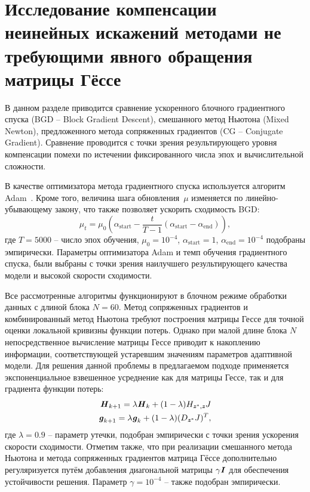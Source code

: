 \section{Исследование компенсации неинейных искажений методами не требующими явного обращения матрицы Гёссе} \label{sec:conj_grad}

В данном разделе приводится сравнение ускоренного блочного градиентного спуска (BGD -- Block Gradient Descent), смешанного метод Ньютона (Mixed Newton), предложенного метода сопряженных градиентов (CG -- Conjugate Gradient). Сравнение проводится с точки зрения результирующего уровня компенсации помехи по истечении фиксированного числа эпох и вычислительной сложности.

В качестве оптимизатора метода градиентного спуска используется алгоритм Adam~\cite{kingma2014adam}. Кроме того, величина шага обновления~$\mu$ изменяется по линейно-убывающему закону, что также позволяет ускорить сходимость BGD:
\begin{equation}
	\mu_t=\mu_0(\alpha_{\text{start}}-\frac{t}{T-1}(\alpha_{\text{start}}-\alpha_{\text{end}})),
	\label{linear_scheduler}
\end{equation}
где $T=5000$ -- число эпох обучения, $\mu_0=10^{-4}$, $\alpha_{\text{start}}=1$, $\alpha_{\text{end}}=10^{-4}$ подобраны эмпирически. Параметры оптимизатора Adam и темп обучения градиентного спуска, были выбраны с точки зрения наилучшего результирующего качества модели и высокой скорости сходимости.

Все рассмотренные алгоритмы функционируют в блочном режиме обработки данных с длиной блока $N=60$. Метод сопряженных градиентов и комбинированный метод Ньютона требуют построения матрицы Гессе для точной оценки локальной кривизны функции потерь. Однако при малой длине блока $N$ непосредственное вычисление матрицы Гессе приводит к накоплению информации, соответствующей устаревшим значениям параметров адаптивной модели. Для решения данной проблемы в предлагаемом подходе применяется экспоненциальное взвешенное усреднение как для матрицы Гессе, так и для градиента функции потерь:
\begin{align}
	\textbf{\textit{H}}_{k+1}=\lambda\textbf{\textit{H}}_{k}+(1-\lambda)H_{\textbf{\textit{z}}^*,\textbf{\textit{z}}}J \\
	\textbf{\textit{g}}_{k+1}=\lambda\textbf{\textit{g}}_{k}+(1-\lambda)(D_{\textbf{\textit{z}}^*}J)^T,
	\label{hessian_grad_accum}
\end{align}
где $\lambda=0.9$ -- параметр утечки, подобран эмпирически с точки зрения ускорения скорости сходимости. Отметим также, что при реализации смешанного метода Ньютона и метода сопряженных градиентов матрица Гёссе дополнительно регуляризуется путём добавления диагональной матрицы $\gamma\textbf{\textit{I}}$ для обеспечения устойчивости решения. Параметр $\gamma=10^{-4}$ -- также подобран эмпирически.

